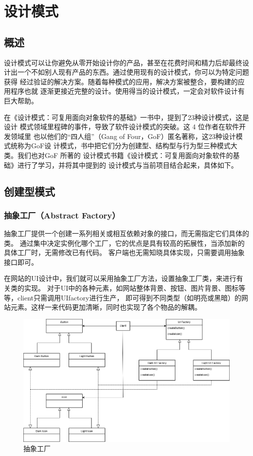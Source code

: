 \documentclass[12pt]{ctexart} %
\begin{document}
\section{设计模式}
\subsection{概述}
设计模式可以让你避免从零开始设计你的产品，甚至在花费时间和精力后却最终设
计出一个不如别人现有产品的东西。通过使用现有的设计模式，你可以为特定问题获得
经过验证的解决方案。随着每种模式的应用，解决方案被整合，要构建的应用程序也就
逐渐更接近完整的设计。使用得当的设计模式，一定会对软件设计有巨大帮助。

在《设计模式：可复用面向对象软件的基础》一书中，提到了23种设计模式，这是设计
模式领域里程碑的事件，导致了软件设计模式的突破。这 4 位作者在软件开发领域里
也以他们的“四人组”（Gang of Four，GoF）匿名著称，这23种设计模式统称为GoF设
计模式，书中把它们分为创建型、结构型与行为型三种模式大类。我们也对GoF 所著的
设计模式书籍《设计模式：可复用面向对象软件的基础》进行了学习，并将其中提到的
设计模式与当前项目结合起来，具体如下。

\subsection{创建型模式} %
\subsubsection{抽象工厂（Abstract Factory）} 
抽象工厂提供一个创建一系列相关或相互依赖对象的接口，而无需指定它们具体的类。
通过集中决定实例化哪个工厂，它的优点是具有较高的拓展性，当添加新的具体工厂时，无需修改已有代码。
客户端也无需知晓具体实现，只需要调用抽象接口即可。

在网站的UI设计中，我们就可以采用抽象工厂方法，设置抽象工厂类，来进行有关类的实现。
对于UI中的各种元素，如网站整体背景、按钮、图片背景、图标等等，client只需调用UIfactory进行生产，
即可得到不同类型（如明亮或黑暗）的网站元素。这样一来代码更加清晰，同时也实现了各个物品的解耦。
\begin{figure}[H]
  \centering
  \includegraphics[width=\textwidth]{abs_factory.png}
  \caption{抽象工厂}
\end{figure}
\end{document}
